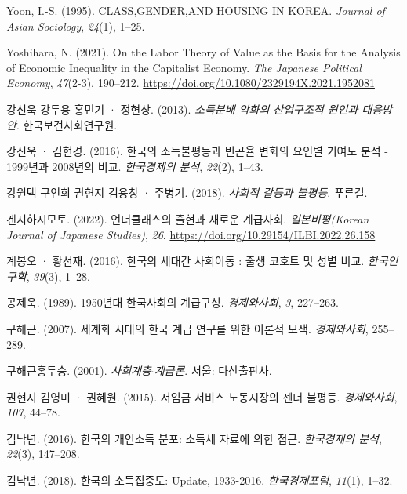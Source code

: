 \documentclass[
  letterpaper,
  DIV=11,
  numbers=noendperiod]{scrartcl}
\newlength{\cslhangindent}
\newenvironment{CSLReferences}[2] %
 {\begin{list}{}{%
  \setlength{\itemindent}{0pt}
  \setlength{\leftmargin}{0pt}
  \setlength{\parsep}{0pt}
  \ifodd #1
   \setlength{\leftmargin}{\cslhangindent}
   \setlength{\itemindent}{-1\cslhangindent}
  \fi
  \setlength{\itemsep}{#2\baselineskip}}}
 {\end{list}}
\begin{document}
\begin{CSLReferences}{1}{0}
Yoon, I.-S. (1995). {CLASS,GENDER,AND HOUSING IN KOREA}. \emph{Journal
of Asian Sociology}, \emph{24}(1), 1--25.

Yoshihara, N. (2021). On the Labor Theory of Value as the Basis for the
Analysis of Economic Inequality in the Capitalist Economy. \emph{The
Japanese Political Economy}, \emph{47}(2-3), 190--212.
\url{https://doi.org/10.1080/2329194X.2021.1952081}

강신욱 강두용 홍민기 · 정현상. (2013). \emph{{소득분배 악화의 산업구조적
원인과 대응방안}}. 한국보건사회연구원.

강신욱 · 김현경. (2016). {한국의 소득불평등과 빈곤율 변화의 요인별
기여도 분석 - 1999년과 2008년의 비교}. \emph{한국경제의 분석},
\emph{22}(2), 1--43.

강원택 구인회 권현지 김용창 · 주병기. (2018). \emph{사회적 갈등과
불평등}. 푸른길.

겐지하시모토. (2022). {언더클래스의 출현과 새로운 계급사회}.
\emph{일본비평(Korean Journal of Japanese Studies)}, \emph{26}.
\url{https://doi.org/10.29154/ILBI.2022.26.158}

계봉오 · 황선재. (2016). {한국의 세대간 사회이동 : 출생 코호트 및 성별
비교}. \emph{한국인구학}, \emph{39}(3), 1--28.

공제욱. (1989). {1950년대 한국사회의 계급구성}. \emph{경제와사회},
\emph{3}, 227--263.

구해근. (2007). {세계화 시대의 한국 계급 연구를 위한 이론적 모색}.
\emph{경제와사회}, 255--289.

구해근홍두승. (2001). \emph{{사회계층{\(\cdot\)}계급론}}. 서울:
다산출판사.

권현지 김영미 · 권혜원. (2015). {저임금 서비스 노동시장의 젠더 불평등}.
\emph{경제와사회}, \emph{107}, 44--78.

김낙년. (2016). 한국의 개인소득 분포: 소득세 자료에 의한 접근.
\emph{한국경제의 분석}, \emph{22}(3), 147--208.

김낙년. (2018). 한국의 소득집중도: Update, 1933-2016.
\emph{한국경제포럼}, \emph{11}(1), 1--32.


\end{CSLReferences}
\end{document}
